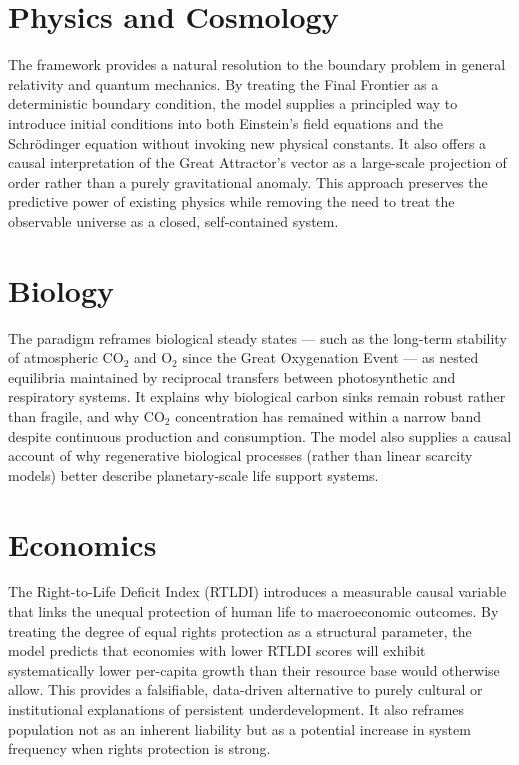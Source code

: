 \section{Physics and Cosmology}

The framework provides a natural resolution to the boundary problem in general relativity and quantum mechanics. By treating the Final Frontier as a deterministic boundary condition, the model supplies a principled way to introduce initial conditions into both Einstein’s field equations and the Schrödinger equation without invoking new physical constants. It also offers a causal interpretation of the Great Attractor’s vector as a large-scale projection of order rather than a purely gravitational anomaly. This approach preserves the predictive power of existing physics while removing the need to treat the observable universe as a closed, self-contained system.

\section{Biology}

The paradigm reframes biological steady states — such as the long-term stability of atmospheric CO$_2$ and O$_2$ since the Great Oxygenation Event — as nested equilibria maintained by reciprocal transfers between photosynthetic and respiratory systems. It explains why biological carbon sinks remain robust rather than fragile, and why CO$_2$ concentration has remained within a narrow band despite continuous production and consumption. The model also supplies a causal account of why regenerative biological processes (rather than linear scarcity models) better describe planetary-scale life support systems.

\section{Economics}

The Right-to-Life Deficit Index (RTLDI) introduces a measurable causal variable that links the unequal protection of human life to macroeconomic outcomes. By treating the degree of equal rights protection as a structural parameter, the model predicts that economies with lower RTLDI scores will exhibit systematically lower per-capita growth than their resource base would otherwise allow. This provides a falsifiable, data-driven alternative to purely cultural or institutional explanations of persistent underdevelopment. It also reframes population not as an inherent liability but as a potential increase in system frequency when rights protection is strong.

